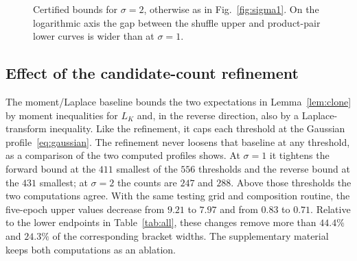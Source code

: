 \documentclass[conference]{IEEEtran}
\newcommand{\eps}{\varepsilon}
\begin{document}
\begin{figure}[t]
\centering
{}
\caption{Certified bounds for $\sigma=2$, otherwise as in Fig.~\ref{fig:sigma1}. On the logarithmic axis the gap between the shuffle upper and product-pair lower curves is wider than at $\sigma=1$.}
\label{fig:sigma2}
\end{figure}

\subsection{Effect of the candidate-count refinement}
The moment/Laplace baseline bounds the two expectations in Lemma~\ref{lem:clone} by moment inequalities for $L_K$ and, in the reverse direction, also by a Laplace-transform inequality. Like the refinement, it caps each threshold at the Gaussian profile~\eqref{eq:gaussian}. The refinement never loosens that baseline at any threshold, as a comparison of the two computed profiles shows. At $\sigma=1$ it tightens the forward bound at the $411$ smallest of the $556$ thresholds and the reverse bound at the $431$ smallest; at $\sigma=2$ the counts are $247$ and $288$. Above those thresholds the two computations agree. With the same testing grid and composition routine, the five-epoch upper values decrease from $9.21$ to $7.97$ and from $0.83$ to $0.71$. Relative to the lower endpoints in Table~\ref{tab:all}, these changes remove more than $44.4\%$ and $24.3\%$ of the corresponding bracket widths. The supplementary material keeps both computations as an ablation.
\end{document}
